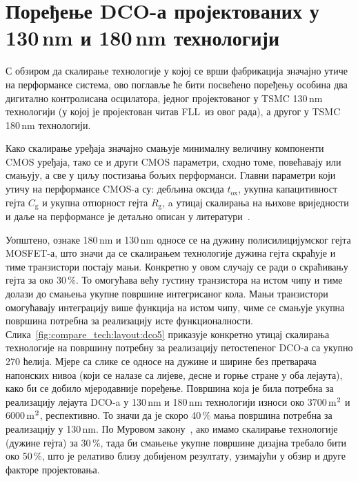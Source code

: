 \documentclass[master]{finthesis}
\def \FLL  {FLL} %
\def \DCO  {DCO} %
\begin{document}
\section{Поређење \DCO-а пројектованих у 130\texorpdfstring{\,}{ }nm и 180\texorpdfstring{\,}{ }nm технологији} \label{section:compare_tech}
С обзиром да скалирање технологије у којој се врши фабрикација значајно утиче на перформансе система, ово поглавље ће бити посвећено поређењу особина два дигитално контролисана осцилатора, једног пројектованог у TSMC 130\,nm технологији (у којој је пројектован читав \FLL\ из овог рада), а другог у TSMC 180\,nm технологији. \par
Како скалирање уређаја значајно смањује минималну величину компоненти CMOS уређаја, тако се и други CMOS параметри, сходно томе, повећавају или смањују, а све у циљу постизања бољих перформанси. Главни параметри који утичу на перформансе CMOS-а су: дебљина оксида $t_\text{ox}$, укупна капацитивност гејта $C_\text{g}$ и укупна отпорност гејта $R_\text{g}$, a утицај скалирања на њихове вриједности и даље на перформансе је детаљно описан у литератури~\cite{HASSAN2006275}. \par
Уопштено, ознаке 180\,nm и 130\,nm односе се на дужину полисилицијумског гејта MOSFET-а, што значи да се скалирањем технологије дужина гејта скраћује и тиме транзистори постају мањи. Конкретно у овом случају се ради о скраћивању гејта за око 30\,\%. То омогућава већу густину транзистора на истом чипу и тиме долази до смањења укупне површине интегрисаног кола. Мањи транзистори омогућавају интеграцију више функција на истом чипу, чиме се смањује укупна површина потребна за реализацију исте функционалности. Слика~\ref{fig:compare_tech:layout:dco5} приказује конкретно утицај скалирања технологије на површину потребну за реализацију петостепеног \DCO-а са укупно 270 ћелија. Мјере са слике се односе на дужине и ширине без претварача напонских нивоа (који се налазе са лијеве, десне и горње стране у оба лејаута), како би се добило мјеродавније поређење. Површина која је била потребна за реализацију лејаута \DCO-a у 130\,nm и 180\,nm технологији износи око 3700\,\text\textmu m$^\text2$ и 6000\,\text\textmu m$^\text2$, респективно. То значи да је скоро 40\,\% мања површина потребна за реализацију у 130\,nm. По Муровом закону~\cite{Moore:658762}, ако имамо скалирање технологије (дужине гејта) за 30\,\%, тада би смањење укупне површине дизајна требало бити око 50\,\%, што је релативо близу добијеном резултату, узимајући у обзир и друге факторе пројектовања. \par
\end{document}
